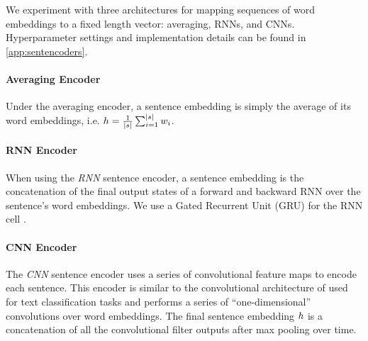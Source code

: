 We experiment with three architectures for mapping sequences
of word embeddings to a fixed length vector: averaging, RNNs, and CNNs.
Hyperparameter settings and implementation details can be found 
in \autoref{app:sentencoders}.

\paragraph{Averaging Encoder} Under the averaging encoder, a sentence 
embedding \sentEmb is simply the average of its word embeddings, i.e. 
$\sentEmb = \frac{1}{\sentSize} \sum_{i=1}^{\sentSize} \wordEmb[i]$.

\paragraph{RNN Encoder} When using  the \textit{RNN} sentence encoder,
a sentence embedding is the concatenation of the final output states of a 
forward and backward RNN over the sentence's word embeddings. We use a Gated 
Recurrent Unit (GRU) for the RNN cell \cite{chung2014empirical}.

\paragraph{CNN Encoder} The \textit{CNN} sentence encoder uses a series of 
convolutional feature maps to encode each sentence. This encoder is similar
to the convolutional architecture of \citet{kim2014convolutional} used for 
text classification tasks and performs a series of ``one-dimensional'' 
convolutions over word embeddings. The final sentence embedding $\sentEmb$ is 
a concatenation of all the convolutional filter outputs after max pooling over
time.


